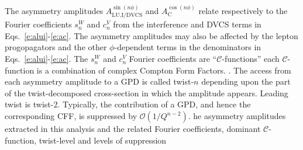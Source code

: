 The asymmetry amplitudes $A_{\textrm{LU,I/DVCS}}^{\sin(n\phi)}$ and
$A_{\textrm{C}}^{\cos(n\phi)}$ relate respectively to the Fourier
coefficients $s_{n}^{W}$ and $c_{n}^{V}$ from the interference and DVCS terms in Eqs.~\ref{e:alui}-\ref{e:ac}. The asymmetry amplitudes may also be affected by the lepton progopagators and the other $\phi$-dependent terms in the denominators in Eqs.~\ref{e:alui}-\ref{e:ac}. The  $s_{n}^{W}$ and $c_{n}^{V}$ Fourier coefficients are   ``$\mathcal{C}$-functions''\blue{,} each  $\mathcal{C}$-function is a combination of complex Compton Form Factors. .  The access from each asymmetry amplitude to a GPD is called twist-$n$ depending upon the part of the twist-decomposed cross-section in which the amplitude appears. Leading twist is twist-2. Typically, the contribution of a  GPD, and hence the corresponding CFF, is suppressed by $\mathcal{O}(1/Q^{n-2})$. he asymmetry amplitudes extracted in this analysis and the related Fourier coefficients, dominant $\mathcal{C}$-function, twist-level and levels of suppression

